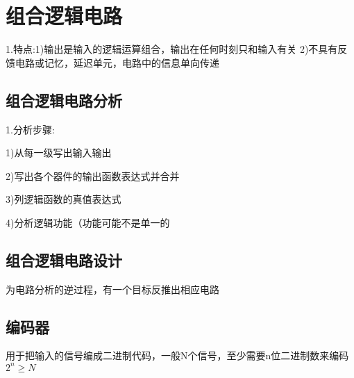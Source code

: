 \documentclass[11pt,twoside,a4paper]{ctexart}
\begin{document}
    \section{组合逻辑电路}
    1.特点:1)输出是输入的逻辑运算组合，输出在任何时刻只和输入有关
    2)不具有反馈电路或记忆，延迟单元，电路中的信息单向传递
    \subsection{组合逻辑电路分析}
    1.分析步骤:
    \begin{minipage}[t]{0.9\linewidth}
        1)从每一级写出输入输出

        2)写出各个器件的输出函数表达式并合并

        3)列逻辑函数的真值表达式

        4)分析逻辑功能（功能可能不是单一的

    \end{minipage}
    \subsection{组合逻辑电路设计}
    为电路分析的逆过程，有一个目标反推出相应电路
    \subsection{编码器}
    用于把输入的信号编成二进制代码，一般N个信号，至少需要n位二进制数来编码
    $2^n \geq N$
\end{document}
